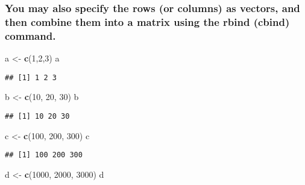 \documentclass[]{article}
\newenvironment{Shaded}{\begin{snugshade}}{\end{snugshade}}
\newcommand{\KeywordTok}[1]{\textcolor[rgb]{0.13,0.29,0.53}{\textbf{#1}}}
\newcommand{\DecValTok}[1]{\textcolor[rgb]{0.00,0.00,0.81}{#1}}
\newcommand{\StringTok}[1]{\textcolor[rgb]{0.31,0.60,0.02}{#1}}
\newcommand{\NormalTok}[1]{#1}
\begin{document}
\subsubsection{You may also specify the rows (or columns) as vectors,
and then combine them into a matrix using the rbind (cbind)
command.}\label{you-may-also-specify-the-rows-or-columns-as-vectors-and-then-combine-them-into-a-matrix-using-the-rbind-cbind-command.}

\begin{Shaded}
\begin{Highlighting}[]
\NormalTok{a <-}\StringTok{ }\KeywordTok{c}\NormalTok{(}\DecValTok{1}\NormalTok{,}\DecValTok{2}\NormalTok{,}\DecValTok{3}\NormalTok{)}
\NormalTok{a}
\end{Highlighting}
\end{Shaded}

\begin{verbatim}
## [1] 1 2 3
\end{verbatim}

\begin{Shaded}
\begin{Highlighting}[]
\NormalTok{b <-}\StringTok{ }\KeywordTok{c}\NormalTok{(}\DecValTok{10}\NormalTok{, }\DecValTok{20}\NormalTok{, }\DecValTok{30}\NormalTok{)}
\NormalTok{b}
\end{Highlighting}
\end{Shaded}

\begin{verbatim}
## [1] 10 20 30
\end{verbatim}

\begin{Shaded}
\begin{Highlighting}[]
\NormalTok{c <-}\StringTok{ }\KeywordTok{c}\NormalTok{(}\DecValTok{100}\NormalTok{, }\DecValTok{200}\NormalTok{, }\DecValTok{300}\NormalTok{)}
\NormalTok{c}
\end{Highlighting}
\end{Shaded}

\begin{verbatim}
## [1] 100 200 300
\end{verbatim}

\begin{Shaded}
\begin{Highlighting}[]
\NormalTok{d <-}\StringTok{ }\KeywordTok{c}\NormalTok{(}\DecValTok{1000}\NormalTok{, }\DecValTok{2000}\NormalTok{, }\DecValTok{3000}\NormalTok{)}
\NormalTok{d}
\end{Highlighting}
\end{Shaded}
\end{document}
